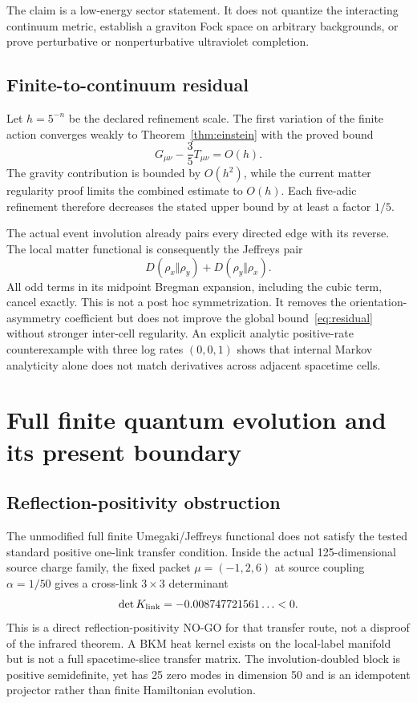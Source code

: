 \documentclass[11pt]{article}
\theoremstyle{definition}
\theoremstyle{remark}
\begin{document}
The claim is a low-energy sector statement. It does not quantize the interacting continuum metric, establish a graviton Fock space on arbitrary backgrounds, or prove perturbative or nonperturbative ultraviolet completion.

\subsection{Finite-to-continuum residual}

Let $h=5^{-n}$ be the declared refinement scale. The first variation of the finite action converges weakly to Theorem~\ref{thm:einstein} with the proved bound
\begin{equation}\label{eq:residual}
 G_{\mu\nu}-\frac35T_{\mu\nu}=O(h).
\end{equation}
The gravity contribution is bounded by $O(h^2)$, while the current matter regularity proof limits the combined estimate to $O(h)$. Each five-adic refinement therefore decreases the stated upper bound by at least a factor $1/5$.

The actual event involution already pairs every directed edge with its reverse. The local matter functional is consequently the Jeffreys pair
\begin{equation}
 D(\rho_x\Vert\rho_y)+D(\rho_y\Vert\rho_x).
\end{equation}
All odd terms in its midpoint Bregman expansion, including the cubic term, cancel exactly. This is not a post hoc symmetrization. It removes the orientation-asymmetry coefficient but does not improve the global bound~\eqref{eq:residual} without stronger inter-cell regularity. An explicit analytic positive-rate counterexample with three log rates $(0,0,1)$ shows that internal Markov analyticity alone does not match derivatives across adjacent spacetime cells.

\section{Full finite quantum evolution and its present boundary}\label{sec:finitequantum}

\subsection{Reflection-positivity obstruction}

The unmodified full finite Umegaki/Jeffreys functional does not satisfy the tested standard positive one-link transfer condition. Inside the actual 125-dimensional source charge family, the fixed packet $\mu=(-1,2,6)$ at source coupling $\alpha=1/50$ gives a cross-link $3\times3$ determinant
\begin{equation}
 \det K_{\rm link}=-0.008747721561\ldots<0.
\end{equation}
This is a direct reflection-positivity NO-GO for that transfer route, not a disproof of the infrared theorem. A BKM heat kernel exists on the local-label manifold but is not a full spacetime-slice transfer matrix. The involution-doubled block is positive semidefinite, yet has 25 zero modes in dimension 50 and is an idempotent projector rather than finite Hamiltonian evolution.
\end{document}
